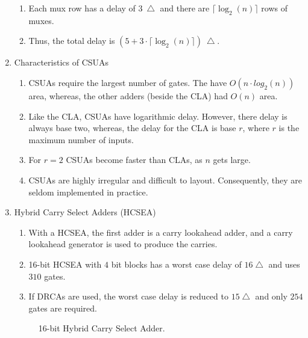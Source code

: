 \documentclass[times, twocolumn, 10pt]{article}
\begin{document}
\begin{enumerate}
\begin{enumerate}
  \item  Each mux row has a delay of $3~\bigtriangleup$ and there 
    are $\lceil \log_{2}(n) \rceil$ rows of muxes. 
  \item  Thus, the total delay is $(5 + 3 \cdot \lceil \log_{2}(n)
    \rceil)~\bigtriangleup$.
  \end{enumerate}
\item Characteristics of CSUAs
  \begin{enumerate}
  \item CSUAs require the largest number of gates. The have
    $O(n \cdot log_{2}(n))$ area, whereas, the other adders (beside the CLA)
    had $O(n)$ area. 
  \item Like the CLA, CSUAs have logarithmic delay. However, there
    delay is always base two, whereas, the delay for the CLA 
    is base $r$, where $r$ is the maximum number of inputs. 
  \item For $r = 2$ CSUAs become faster than CLAs, as $n$
    gets large. 
  \item CSUAs are highly irregular and difficult to layout. Consequently, 
    they are seldom implemented in practice. 
  \end{enumerate}

\item Hybrid Carry Select Adders (HCSEA)
  \begin{enumerate}
  \item With a HCSEA, the first adder is a carry lookahead adder, 
    and a carry lookahead generator is used to produce the carries. 
  \item 16-bit HCSEA with $4$ bit blocks has a worst case delay of $16
    \bigtriangleup$ and uses $310$ gates. 
  \item If DRCAs are used, the worst case delay is reduced to $15
    \bigtriangleup$ and only $254$ gates are required. 
  \end{enumerate}
  \begin{figure*} [p]
    \begin{center}
      \setlength{\unitlength}{0.0105in}%
    \end{center}
    \label{hybrid_sel16.fig}
    \caption{16-bit Hybrid Carry Select Adder.}
  \end{figure*}
  

\end{enumerate}
\end{document}
